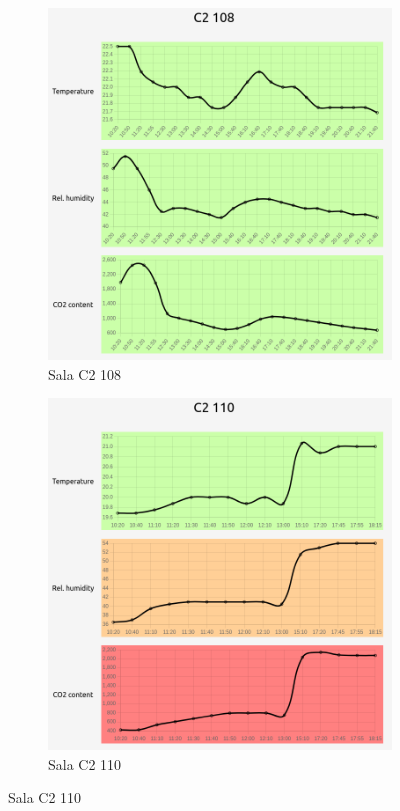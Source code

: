 \begin{figure}[H]
    \begin{subfigure}{0.5\textwidth}
        \centering
        \includegraphics[width=\linewidth]{zdj/app/readings-c2108.png}
        \caption{Sala C2 108}
    \end{subfigure}
    \begin{subfigure}{0.5\textwidth}
        \centering
        \includegraphics[width=\linewidth]{zdj/app/readings-c2110.png}
        \caption{Sala C2 110}
    \end{subfigure}
\end{figure}
